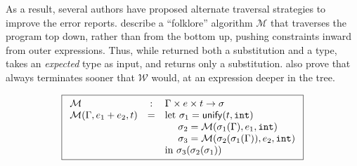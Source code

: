 As a result, several authors have proposed alternate traversal
strategies to improve the error reports.
%
\citet{Lee1998-ys} describe a ``folklore'' algorithm $\mathcal{M}$ that
traverses the program top down, rather than from the bottom up, pushing
constraints inward from outer expressions.
%
Thus, while \W returned both a substitution and a type, \M takes an
\emph{expected} type as input, and returns only a substitution.
%
\citeauthor{Lee1998-ys} also prove that \M always terminates sooner that
$\mathcal{W}$ would, \ie at an expression deeper in the tree.
%
\begin{figure}
\centering
\[
\boxed{
\begin{array}{lcl}
\mathcal{M} & : & \Gamma \times e \times t \rightarrow \sigma \\
\mathcal{M}(\Gamma, e_1 + e_2, t)
   & = & \text{let } \sigma_1 = \mathsf{unify}(t,\mathtt{int}) \\
   &   & \quad\ \sigma_2 = \mathcal{M}(\sigma_1(\Gamma), e_1, \mathtt{int}) \\
   &   & \quad\ \sigma_3 = \mathcal{M}(\sigma_2(\sigma_1(\Gamma)), e_2, \mathtt{int}) \\
   &   & \text{in } \sigma_3(\sigma_2(\sigma_1)) \\

\end{array}}\]
\end{figure}
